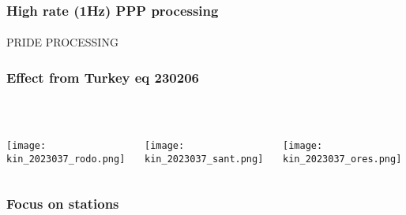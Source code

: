 \begin{frame}
  \frametitle{High rate (1Hz) PPP processing}
  \framesubtitle{}
  \label{}
  PRIDE PROCESSING
\end{frame}
\note{}

\begin{frame}
  \frametitle{Effect from Turkey eq 230206}
  \framesubtitle{}
  \label{}\
  \vskip-1cm
  \begin{columns}[T]
    \begin{column}{.33\textwidth}
      \begin{center}
         \texttt{[image: kin\_2023037\_rodo.png]}
       \end{center} 
    \end{column}
    \begin{column}{.33\textwidth}
      \begin{center}
        \texttt{[image: kin\_2023037\_sant.png]}
      \end{center}
    \end{column}
    \begin{column}{.33\textwidth}
      \begin{center}
        \texttt{[image: kin\_2023037\_ores.png]}
      \end{center}
    \end{column}
  \end{columns}
\end{frame}
\note{}

\begin{frame}
  \frametitle{Focus on stations}
  \framesubtitle{}
  \label{}

\end{frame}
\note{}

%





